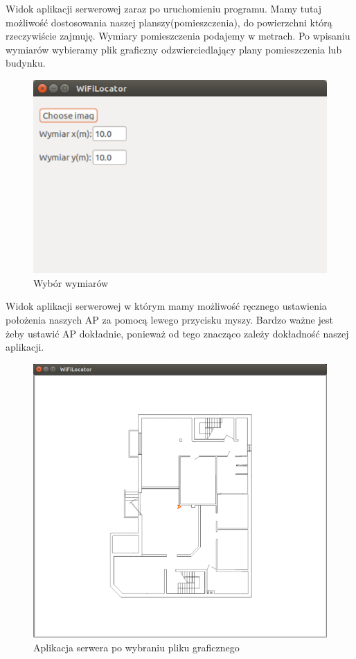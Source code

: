 \documentclass{article}
\begin{document}
Widok aplikacji serwerowej zaraz po uruchomieniu programu. Mamy tutaj możliwość dostosowania naszej planszy(pomieszczenia), do powierzchni którą rzeczywiście zajmuję. Wymiary pomieszczenia podajemy w metrach. Po wpisaniu wymiarów wybieramy plik graficzny odzwierciedlający plany pomieszczenia lub budynku.

\begin{figure}[H]
	\centering
	\includegraphics[width=15cm]{wymiary.png}
	\caption{Wybór wymiarów}
	\label{fig:rysowanie.jpg}
\end{figure}
\newpage
Widok aplikacji serwerowej w którym mamy możliwość ręcznego ustawienia położenia naszych AP za pomocą lewego przycisku myszy. Bardzo ważne jest żeby ustawić AP dokładnie, ponieważ od tego znacząco zależy dokładność naszej aplikacji.

\begin{figure}[H]
	\centering
	\includegraphics[width=15cm]{serwer.png}
	\caption{Aplikacja serwera po wybraniu pliku graficznego}
	\label{fig:rysowanie.jpg}
\end{figure}
\end{document}
